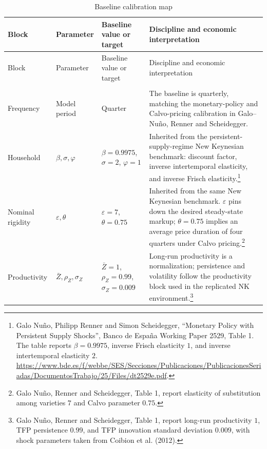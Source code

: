 ﻿\documentclass[12pt]{article}
\theoremstyle{remark}
\begin{document}
\begingroup
\small
\setlength{\tabcolsep}{3pt}
\begin{longtable}{
>{\raggedright\arraybackslash}p{}
>{\raggedright\arraybackslash}p{}
>{\raggedright\arraybackslash}p{}
>{\raggedright\arraybackslash}p{}}
\caption{Baseline calibration map}
\label{tab:baseline_calibration}\\
\toprule
Block & Parameter & Baseline value or target & Discipline and economic interpretation \\
\midrule
\endfirsthead
\toprule
Block & Parameter & Baseline value or target & Discipline and economic interpretation \\
\midrule
\endhead
\midrule
\multicolumn{4}{r}{Continued on next page} \\
\midrule
\endfoot
\bottomrule
\endlastfoot

Frequency
&
Model period
&
Quarter
&
The baseline is quarterly, matching the monetary-policy and Calvo-pricing calibration in
Galo--Nu\~no, Renner and Scheidegger.
\\

Household
&
$\beta,\sigma,\varphi$
&
$\beta=0.9975$, $\sigma=2$, $\varphi=1$
&
Inherited from the persistent-supply-regime New Keynesian benchmark: discount factor, inverse
intertemporal elasticity, and inverse Frisch elasticity.\footnote{Galo Nu\~no, Philipp Renner and
Simon Scheidegger, ``Monetary Policy with Persistent Supply Shocks'', Banco de Espa\~na Working
Paper 2529, Table 1. The table reports $\beta=0.9975$, inverse Frisch elasticity $1$, and inverse
intertemporal elasticity $2$. \url{https://www.bde.es/f/webbe/SES/Secciones/Publicaciones/PublicacionesSeriadas/DocumentosTrabajo/25/Files/dt2529e.pdf}.}
\\

Nominal rigidity
&
$\varepsilon,\theta$
&
$\varepsilon=7$, $\theta=0.75$
&
Inherited from the same New Keynesian benchmark. $\varepsilon$ pins down the desired steady-state
markup; $\theta=0.75$ implies an average price duration of four quarters under Calvo pricing.\footnote{Galo
Nu\~no, Renner and Scheidegger, Table 1, report elasticity of substitution among varieties $7$ and
Calvo parameter $0.75$.}
\\

Productivity
&
$\bar Z,\rho_Z,\sigma_Z$
&
$\bar Z=1$, $\rho_Z=0.99$, $\sigma_Z=0.009$
&
Long-run productivity is a normalization; persistence and volatility follow the productivity block
used in the replicated NK environment.\footnote{Galo Nu\~no, Renner and Scheidegger, Table 1,
report long-run productivity $1$, TFP persistence $0.99$, and TFP innovation standard deviation
$0.009$, with shock parameters taken from Coibion et al. (2012).}
\\


\end{longtable}
\end{document}
